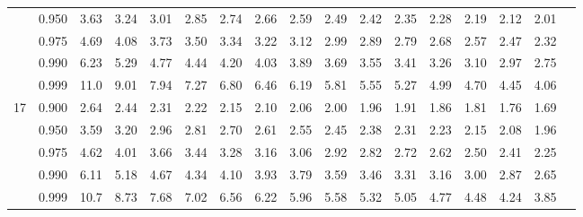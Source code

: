 {\begin{center}
\begin{tabular}{rrr@{\,}r@{\,}r@{\,}r@{\,}r@{\,}r@{\,}r@{\,}r
                   @{\,}r@{\,}r@{\,}r@{\,}r@{\,}r@{\,}r@{\,}r}
  &0.950&3.63&3.24&3.01&2.85&2.74&2.66&2.59&2.49&2.42&2.35&2.28&2.19&2.12&2.01\\
  &0.975&4.69&4.08&3.73&3.50&3.34&3.22&3.12&2.99&2.89&2.79&2.68&2.57&2.47&2.32\\
  &0.990&6.23&5.29&4.77&4.44&4.20&4.03&3.89&3.69&3.55&3.41&3.26&3.10&2.97&2.75\\
  &0.999&11.0&9.01&7.94&7.27&6.80&6.46&6.19&5.81&5.55&5.27&4.99&4.70&4.45&4.06\\
17&0.900&2.64&2.44&2.31&2.22&2.15&2.10&2.06&2.00&1.96&1.91&1.86&1.81&1.76&1.69\\
  &0.950&3.59&3.20&2.96&2.81&2.70&2.61&2.55&2.45&2.38&2.31&2.23&2.15&2.08&1.96\\
  &0.975&4.62&4.01&3.66&3.44&3.28&3.16&3.06&2.92&2.82&2.72&2.62&2.50&2.41&2.25\\
  &0.990&6.11&5.18&4.67&4.34&4.10&3.93&3.79&3.59&3.46&3.31&3.16&3.00&2.87&2.65\\
  &0.999&10.7&8.73&7.68&7.02&6.56&6.22&5.96&5.58&5.32&5.05&4.77&4.48&4.24&3.85
\end{tabular}
\end{center}

\newpage

\thispagestyle{empty}

}
